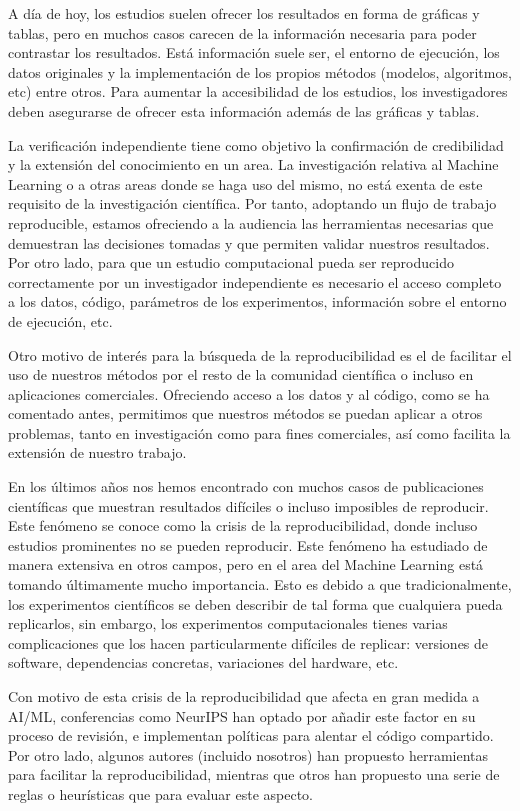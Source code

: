 \documentclass[
  12pt,
  a4paperpaper,
]{report}
\begin{document}
A día de hoy, los estudios suelen ofrecer los resultados en forma de
gráficas y tablas, pero en muchos casos carecen de la información
necesaria para poder contrastar los resultados. Está información suele
ser, el entorno de ejecución, los datos originales y la implementación
de los propios métodos (modelos, algoritmos, etc) entre otros. Para
aumentar la accesibilidad de los estudios, los investigadores deben
asegurarse de ofrecer esta información además de las gráficas y tablas.

La verificación independiente tiene como objetivo la confirmación de
credibilidad y la extensión del conocimiento en un area. La
investigación relativa al Machine Learning o a otras areas donde se haga
uso del mismo, no está exenta de este requisito de la investigación
científica. Por tanto, adoptando un flujo de trabajo reproducible,
estamos ofreciendo a la audiencia las herramientas necesarias que
demuestran las decisiones tomadas y que permiten validar nuestros
resultados. Por otro lado, para que un estudio computacional pueda ser
reproducido correctamente por un investigador independiente es necesario
el acceso completo a los datos, código, parámetros de los experimentos,
información sobre el entorno de ejecución, etc.

Otro motivo de interés para la búsqueda de la reproducibilidad es el de
facilitar el uso de nuestros métodos por el resto de la comunidad
científica o incluso en aplicaciones comerciales. Ofreciendo acceso a
los datos y al código, como se ha comentado antes, permitimos que
nuestros métodos se puedan aplicar a otros problemas, tanto en
investigación como para fines comerciales, así como facilita la
extensión de nuestro trabajo.

En los últimos años nos hemos encontrado con muchos casos de
publicaciones científicas que muestran resultados difíciles o incluso
imposibles de reproducir. Este fenómeno se conoce como la crisis de la
reproducibilidad, donde incluso estudios prominentes no se pueden
reproducir. Este fenómeno ha estudiado de manera extensiva en otros
campos, pero en el area del Machine Learning está tomando últimamente
mucho importancia. Esto es debido a que tradicionalmente, los
experimentos científicos se deben describir de tal forma que cualquiera
pueda replicarlos, sin embargo, los experimentos computacionales tienes
varias complicaciones que los hacen particularmente difíciles de
replicar: versiones de software, dependencias concretas, variaciones del
hardware, etc.

Con motivo de esta crisis de la reproducibilidad que afecta en gran
medida a AI/ML, conferencias como NeurIPS han optado por añadir este
factor en su proceso de revisión, e implementan políticas para alentar
el código compartido. Por otro lado, algunos autores (incluido nosotros)
han propuesto herramientas para facilitar la reproducibilidad, mientras
que otros han propuesto una serie de reglas o heurísticas que para
evaluar este aspecto.
\end{document}
